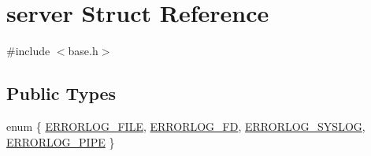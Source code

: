 \hypertarget{structserver}{\section{server Struct Reference}
\label{structserver}
}


{\ttfamily \#include $<$base.\-h$>$}

\subsection*{Public Types}
\begin{DoxyCompactItemize}
\item 
enum \{ \hyperlink{structserver_a5f82bafe63ad0258915c27d92907016aa6676eac2034b029f04b2b5e73f71aa98}{E\-R\-R\-O\-R\-L\-O\-G\-\_\-\-F\-I\-L\-E}, 
\hyperlink{structserver_a5f82bafe63ad0258915c27d92907016aa6ae46f7e633b07a4fe5f2bb8bb96622d}{E\-R\-R\-O\-R\-L\-O\-G\-\_\-\-F\-D}, 
\hyperlink{structserver_a5f82bafe63ad0258915c27d92907016aa05033d373160c45720ee11494bcc52f3}{E\-R\-R\-O\-R\-L\-O\-G\-\_\-\-S\-Y\-S\-L\-O\-G}, 
\hyperlink{structserver_a5f82bafe63ad0258915c27d92907016aada1a5df6b0cabc67725a0a3e5f8b5e33}{E\-R\-R\-O\-R\-L\-O\-G\-\_\-\-P\-I\-P\-E}
 \}
\end{DoxyCompactItemize}
